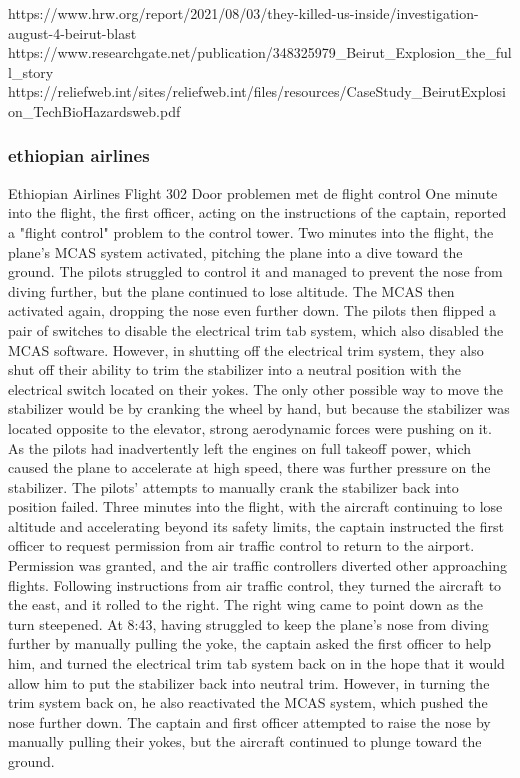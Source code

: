 https://www.hrw.org/report/2021/08/03/they-killed-us-inside/investigation-august-4-beirut-blast 
https://www.researchgate.net/publication/348325979_Beirut_Explosion_the_full_story 
https://reliefweb.int/sites/reliefweb.int/files/resources/CaseStudy_BeirutExplosion_TechBioHazardsweb.pdf 


\subsubsection{ethiopian airlines}
Ethiopian Airlines Flight 302
Door problemen met de flight control
One minute into the flight, the first officer, acting on the instructions of the captain, reported a "flight control" problem to the control tower.
Two minutes into the flight, the plane's MCAS system activated, pitching the plane into a dive toward the ground. The pilots struggled to control it and managed to prevent the nose from diving further, but the plane continued to lose altitude.
The MCAS then activated again, dropping the nose even further down. The pilots then flipped a pair of switches to disable the electrical trim tab system, which also disabled the MCAS software. However, in shutting off the electrical trim system, they also shut off their ability to trim the stabilizer into a neutral position with the electrical switch located on their yokes. The only other possible way to move the stabilizer would be by cranking the wheel by hand, but because the stabilizer was located opposite to the elevator, strong aerodynamic forces were pushing on it.
As the pilots had inadvertently left the engines on full takeoff power, which caused the plane to accelerate at high speed, there was further pressure on the stabilizer. The pilots' attempts to manually crank the stabilizer back into position failed.
Three minutes into the flight, with the aircraft continuing to lose altitude and accelerating beyond its safety limits, the captain instructed the first officer to request permission from air traffic control to return to the airport. Permission was granted, and the air traffic controllers diverted other approaching flights. Following instructions from air traffic control, they turned the aircraft to the east, and it rolled to the right. The right wing came to point down as the turn steepened.
At 8:43, having struggled to keep the plane's nose from diving further by manually pulling the yoke, the captain asked the first officer to help him, and turned the electrical trim tab system back on in the hope that it would allow him to put the stabilizer back into neutral trim. However, in turning the trim system back on, he also reactivated the MCAS system, which pushed the nose further down. The captain and first officer attempted to raise the nose by manually pulling their yokes, but the aircraft continued to plunge toward the ground.

